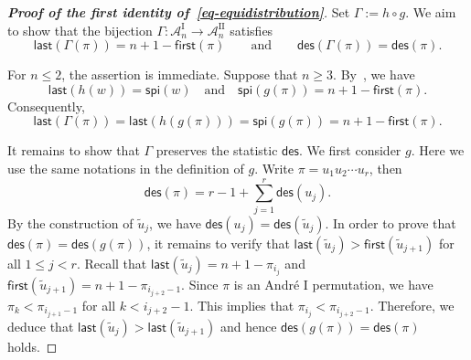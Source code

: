 \documentclass[12pt]{article}
\numberwithin{equation}{section}
\theoremstyle{plain}
\def\des{\mathsf{des}}
\providecommand{\spi}{\mathsf{spi}}
\def\first{\mathsf{first}}
\def\last{\mathsf{last}}
\begin{document}
   			  \begin{proof}[{\bf Proof of the first identity of~\eqref{eq-equidistribution}}]
   			Set $\Gamma:=h\circ g$. We aim to show that the bijection $\Gamma: \mathcal{A}_n^{\mathrm{I}}\rightarrow\mathcal{A}_n^{\mathrm{II}}$ satisfies 
   				\begin{equation}\label{prop:Gamma}
   				\last(\Gamma(\pi))=n+1-\first(\pi)
   				\qquad\text{and}\qquad
   				\des(\Gamma(\pi))=\des(\pi).
   				\end{equation}
	
   				For \(n\leq2\), the assertion is immediate. Suppose that \(n\geq3\).
   				By~\cite[Eqs.~(3.3) and (4.2)]{FH16}, we have 
   				\[
   				\last(h(w))=\spi(w)
   				\quad\text{and}\quad
   				\spi(g(\pi))=n+1-\first(\pi).
   				\]
   				Consequently,
   				\[
   				\last(\Gamma(\pi))
   				=\last(h(g(\pi)))
   				=\spi(g(\pi))
   				=n+1-\first(\pi).
   				\]
   				
   				It remains to show that \(\Gamma\) preserves the statistic $\des$. We
   				first consider \(g\). Here we use the same notations in the definition of $g$.   Write \(\pi=u_1u_2\cdots u_r\), then
   				\[\des(\pi)=r-1+\sum\limits_{j=1}^{r}\des(u_j).\]
				 By the construction of $\tilde u_j$, we have $\des(u_j)=\des(\tilde u_j)$.  In order to prove that $\des(\pi)=\des(g(\pi))$, it remains to verify that $\last(\tilde u_j)>\first(\tilde u_{j+1})$ for all $1\leq j<r$. Recall that 
   				$\last(\tilde u_j)=n+1-\pi_{i_j}$ and $\first(\tilde u_{j+1})=n+1-\pi_{i_{j+2}-1}$. Since  $\pi$ is an Andr\'e $\mathrm{I}$ permutation,  we have $\pi_k<\pi_{i_{j+1}-1}$ for all $k<i_{j+2}-1$. This implies that   $\pi_{i_j}<\pi_{i_{j+2}-1}$. Therefore, we deduce that  $\last(\tilde u_j)>\last(\tilde u_{j+1})$  and hence
   			$\des(g(\pi))=\des(\pi)$ holds. 
   				

\end{proof}
\end{document}
